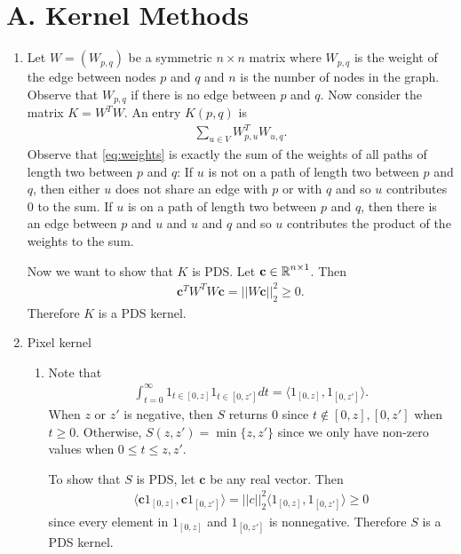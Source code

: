 
\section*{A. Kernel Methods}
\medskip

\begin{enumerate}
    \item Let $W = (W_{p,q})$ be a symmetric
    $n \times n$ matrix
    where $W_{p,q}$ is the weight of the edge between
    nodes $p$ and $q$ and $n$ is the number of nodes
    in the graph.
    Observe that $W_{p,q}$ if there is no edge between
    $p$ and $q$.
    Now consider the matrix $K = W^T W$.
    An entry $K(p,q)$ is
    \begin{align} \label{eq:weights}
        \sum_{u \in V} W_{p,u}^T W_{u,q}.
    \end{align}
    Observe that \autoref{eq:weights} is exactly
    the sum of the weights
    of all paths of length two between $p$ and $q$:
    If $u$ is not on a path of length two between $p$ and $q$,
    then either $u$ does not share an edge with $p$
    or with $q$ and so $u$ contributes 0 to the sum.
    If $u$  is on a path of length two between $p$ and $q$,
    then there is an edge between $p$ and $u$ and $u$ and $q$
    and so $u$ contributes the product of the weights to the sum.

    Now we want to show that $K$ is PDS.
    Let $\mathbf{c} \in \operatorname*{\mathbb{R}}^{n\times 1}$.
    Then
    \begin{align}
        \mathbf{c}^T W^T W \mathbf{c}
        = ||W \mathbf{c}||_2^2 \geq 0.
        \nonumber
    \end{align}
    Therefore $K$ is a PDS kernel.

    \item Pixel kernel
    \begin{enumerate}
    \item Note that
    \begin{align}
        \int_{t=0}^\infty 1_{t \in [0,z]} 1_{t \in [0,z']} dt
        = \langle 1_{[0,z]}, 1_{[0,z']} \rangle.
        \nonumber
    \end{align}
    When $z$ or $z'$ is negative, then $S$ returns 0
    since $t \notin [0,z], [0,z']$ when $t\geq 0$.
    Otherwise, $S(z,z') = \min\{z, z'\}$
    since we only have non-zero values when
    $0 \leq t \leq z,z'$.

    To show that $S$ is PDS, let $\mathbf{c}$
    be any real vector.
    Then
    \begin{align}
        \langle \mathbf{c} 1_{[0,z]}, \mathbf{c} 1_{[0,z']}
        \rangle
        = ||c||_2^2 \langle 1_{[0,z]}, 1_{[0,z']} \rangle
        \geq 0
        \nonumber
    \end{align}
    since every element in $1_{[0,z]}$ and $1_{[0,z']}$
    is nonnegative.
    Therefore $S$ is a PDS kernel.


\end{enumerate}
\end{enumerate}
